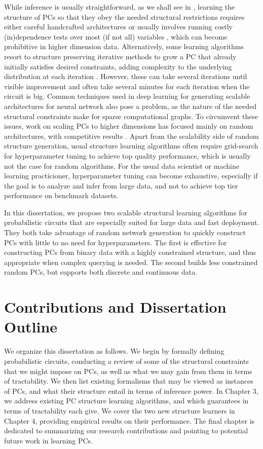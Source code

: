 While inference is usually straightforward, as we shall see in , learning the
structure of PCs so that they obey the needed structural restrictions requires either careful
handcrafted architectures \citep{poon11,cheng14,nath16} or usually involves running costly
(in)dependence tests over most (if not all) variables \citep{gens13,jaini18a,vergari15,dimauro17a},
which can become prohibitive in higher dimension data. Alternatively, some learning algorithms
resort to structure preserving iterative methods to grow a PC that already initially satisfies
desired constraints, adding complexity to the underlying distribution at each iteration
\citep{liang17,dang20}. However, these can take several iterations until visible improvement and
often take several minutes for each iteration when the circuit is big. Common techniques used in
deep learning for generating scalable architectures for neural network also pose a problem, as the
nature of the needed structural constraints make for sparse computational graphs. To circumvent
these issues, work on scaling PCs to higher dimensions has focused mainly on random architectures,
with competitive results \citep{peharz20a,dimauro21,geh21a,peharz20b}. Apart from the scalability
side of random structure generation, usual structure learning algorithms often require grid-search
for hyperparameter tuning to achieve top quality performance, which is usually not the case for
random algorithms. For the usual data scientist or machine learning practicioner, hyperparameter
tuning can become exhaustive, especially if the goal is to analyze and infer from large data, and
not to achieve top tier performance on benchmark datasets.

In this dissertation, we propose two scalable structural learning algorithms for probabilistic
circuits that are especially suited for large data and fast deployment. They both take advantage of
random network generation to quickly construct PCs with little to no need for hyperparameters. The
first is effective for constructing PCs from binary data with a highly constrained structure, and
thus appropriate when complex querying is needed. The second builds less constrained random PCs,
but supports both discrete and continuous data.

\section{Contributions and Dissertation Outline}

We organize this dissertation as follows. We begin  by formally defining probabilistic
circuits, conducting a review of some of the structural constraints that we might impose on PCs, as
well as what we may gain from them in terms of tractability. We then list existing formalisms that
may be viewed as instances of PCs, and what their structure entail in terms of inference power. In
Chapter 3, we address existing PC structure learning algorithms, and which guarantees in terms of
tractability each give. We cover the two new structure learners in Chapter 4, providing empirical
results on their performance. The final chapter is dedicated to summarizing our research
contributions and pointing to potential future work in learning PCs.

